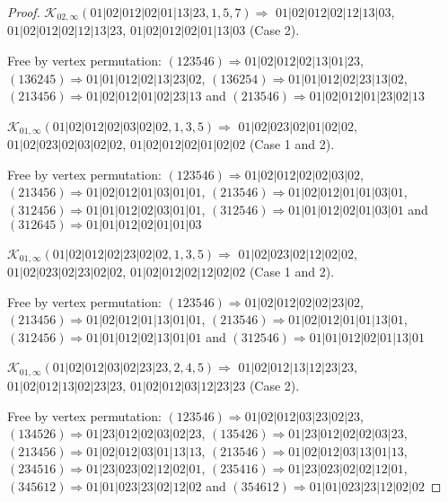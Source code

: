 \documentclass[12pt]{article}
\theoremstyle{plain}
\theoremstyle{definition}
\theoremstyle{remark}
\newcommand{\fancy}[1]{\mathcal{#1}}
\def\K{\fancy{K}}
\begin{document}
\begin{proof}
	
	\bigskip
	
	$\K_{02,\infty}(01|02|012|02|01|13|23,1, 5, 7)\Rightarrow $ $01|02|012|02|12|13|03$, $01|02|012|02|12|13|23$, $01|02|012|02|01|13|03$ (Case 2).
	
	
	
	Free by vertex permutation: $(1 2 3 5 4 6)\Rightarrow 01|02|012|02|13|01|23$, $(1 3 6 2 4 5)\Rightarrow 01|01|012|02|13|23|02$, $(1 3 6 2 5 4)\Rightarrow 01|01|012|02|23|13|02$, $(2 1 3 4 5 6)\Rightarrow 01|02|012|01|02|23|13$ and $(2 1 3 5 4 6)\Rightarrow 01|02|012|01|23|02|13$
	
	
	\bigskip
	
	$\K_{01,\infty}(01|02|012|02|03|02|02,1, 3, 5)\Rightarrow $ $01|02|023|02|01|02|02$, $01|02|023|02|03|02|02$, $01|02|012|02|01|02|02$ (Case 1 and 2).
	
	
	
	Free by vertex permutation: $(1 2 3 5 4 6)\Rightarrow 01|02|012|02|02|03|02$, $(2 1 3 4 5 6)\Rightarrow 01|02|012|01|03|01|01$, $(2 1 3 5 4 6)\Rightarrow 01|02|012|01|01|03|01$, $(3 1 2 4 5 6)\Rightarrow 01|01|012|02|03|01|01$, $(3 1 2 5 4 6)\Rightarrow 01|01|012|02|01|03|01$ and $(3 1 2 6 4 5)\Rightarrow 01|01|012|02|01|01|03$
	
	
	\bigskip
	
	$\K_{01,\infty}(01|02|012|02|23|02|02,1, 3, 5)\Rightarrow $ $01|02|023|02|12|02|02$, $01|02|023|02|23|02|02$, $01|02|012|02|12|02|02$ (Case 1 and 2).
	
	
	
	Free by vertex permutation: $(1 2 3 5 4 6)\Rightarrow 01|02|012|02|02|23|02$, $(2 1 3 4 5 6)\Rightarrow 01|02|012|01|13|01|01$, $(2 1 3 5 4 6)\Rightarrow 01|02|012|01|01|13|01$, $(3 1 2 4 5 6)\Rightarrow 01|01|012|02|13|01|01$ and $(3 1 2 5 4 6)\Rightarrow 01|01|012|02|01|13|01$
	
	
	\bigskip
	
	$\K_{01,\infty}(01|02|012|03|02|23|23,2, 4, 5)\Rightarrow $ $01|02|012|13|12|23|23$, $01|02|012|13|02|23|23$, $01|02|012|03|12|23|23$ (Case 2).
	
	
	
	Free by vertex permutation: $(1 2 3 5 4 6)\Rightarrow 01|02|012|03|23|02|23$, $(1 3 4 5 2 6)\Rightarrow 01|23|012|02|03|02|23$, $(1 3 5 4 2 6)\Rightarrow 01|23|012|02|02|03|23$, $(2 1 3 4 5 6)\Rightarrow 01|02|012|03|01|13|13$, $(2 1 3 5 4 6)\Rightarrow 01|02|012|03|13|01|13$, $(2 3 4 5 1 6)\Rightarrow 01|23|023|02|12|02|01$, $(2 3 5 4 1 6)\Rightarrow 01|23|023|02|02|12|01$, $(3 4 5 6 1 2)\Rightarrow 01|01|023|23|02|12|02$ and $(3 5 4 6 1 2)\Rightarrow 01|01|023|23|12|02|02$
	

\end{proof}
\end{document}
